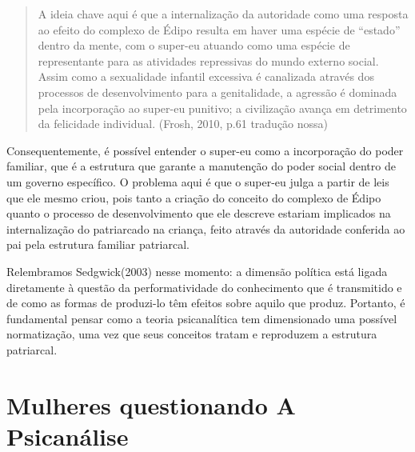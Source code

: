 \begin{quote}
A ideia chave aqui é que a internalização da autoridade como uma
resposta ao efeito do complexo de Édipo resulta em haver uma espécie de
``estado'' dentro da mente, com o super-eu atuando como uma espécie de
representante para as atividades repressivas do mundo externo social.
Assim como a sexualidade infantil excessiva é canalizada através dos
processos de desenvolvimento para a genitalidade, a agressão é dominada
pela incorporação ao super-eu punitivo; a civilização avança em
detrimento da felicidade individual. (Frosh, 2010, p.61 tradução nossa)
\end{quote}

Consequentemente, é possível entender o super-eu como a incorporação do
poder familiar, que é a estrutura que garante a manutenção do poder
social dentro de um governo específico. O problema aqui é que o super-eu
julga a partir de leis que ele mesmo criou, pois tanto a criação do
conceito do complexo de Édipo quanto o processo de desenvolvimento que
ele descreve estariam implicados na internalização do patriarcado na
criança, feito através da autoridade conferida ao pai pela estrutura
familiar patriarcal.

Relembramos Sedgwick(2003) nesse momento: a dimensão política está
ligada diretamente à questão da performatividade do conhecimento que é
transmitido e de como as formas de produzi-lo têm efeitos sobre aquilo
que produz. Portanto, é fundamental pensar como a teoria psicanalítica
tem dimensionado uma possível normatização, uma vez que seus conceitos
tratam e reproduzem a estrutura patriarcal.

\section{Mulheres questionando A Psicanálise }

